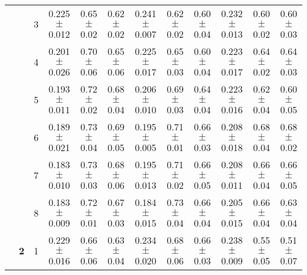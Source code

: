 \begin{table*}
{\begin{tabular}{|l|c|c||c|c|c||c|c|c||c|c|c|}
 & & 3 & \textcolor{gate_color}{0.225$\pm$0.012} & \textcolor{gate_color}{0.65$\pm$0.02} & \textcolor{gate_color}{0.62$\pm$0.02} & \textcolor{mixed_color}{0.241$\pm$0.007} & \textcolor{mixed_color}{0.62$\pm$0.02} & \textcolor{mixed_color}{0.60$\pm$0.04} & \textcolor{pulsed_color}{0.232$\pm$0.013} & \textcolor{pulsed_color}{0.60$\pm$0.02} & \textcolor{pulsed_color}{0.60$\pm$0.03} \\
 & & 4 & \textcolor{gate_color}{0.201$\pm$0.026} & \textcolor{gate_color}{0.70$\pm$0.06} & \textcolor{gate_color}{0.65$\pm$0.06} & \textcolor{mixed_color}{0.225$\pm$0.017} & \textcolor{mixed_color}{0.65$\pm$0.03} & \textcolor{mixed_color}{0.60$\pm$0.04} & \textcolor{pulsed_color}{0.223$\pm$0.017} & \textcolor{pulsed_color}{0.64$\pm$0.02} & \textcolor{pulsed_color}{0.64$\pm$0.03} \\
 & & 5 & \textcolor{gate_color}{0.193$\pm$0.011} & \textcolor{gate_color}{0.72$\pm$0.02} & \textcolor{gate_color}{0.68$\pm$0.04} & \textcolor{mixed_color}{0.206$\pm$0.010} & \textcolor{mixed_color}{0.69$\pm$0.03} & \textcolor{mixed_color}{0.64$\pm$0.04} & \textcolor{pulsed_color}{0.223$\pm$0.016} & \textcolor{pulsed_color}{0.62$\pm$0.04} & \textcolor{pulsed_color}{0.60$\pm$0.05} \\
 & & 6 & \textcolor{gate_color}{0.189$\pm$0.021} & \textcolor{gate_color}{0.73$\pm$0.04} & \textcolor{gate_color}{0.69$\pm$0.05} & \textcolor{mixed_color}{0.195$\pm$0.005} & \textcolor{mixed_color}{0.71$\pm$0.01} & \textcolor{mixed_color}{0.66$\pm$0.03} & \textcolor{pulsed_color}{0.208$\pm$0.018} & \textcolor{pulsed_color}{0.68$\pm$0.04} & \textcolor{pulsed_color}{0.68$\pm$0.02} \\
 & & 7 & \textcolor{gate_color}{0.183$\pm$0.010} & \textcolor{gate_color}{0.73$\pm$0.03} & \textcolor{gate_color}{0.68$\pm$0.06} & \textcolor{mixed_color}{0.195$\pm$0.013} & \textcolor{mixed_color}{0.71$\pm$0.02} & \textcolor{mixed_color}{0.66$\pm$0.05} & \textcolor{pulsed_color}{0.208$\pm$0.011} & \textcolor{pulsed_color}{0.66$\pm$0.04} & \textcolor{pulsed_color}{0.66$\pm$0.05} \\
 & & 8 & \textcolor{gate_color}{0.183$\pm$0.009} & \textcolor{gate_color}{0.72$\pm$0.01} & \textcolor{gate_color}{0.67$\pm$0.03} & \textcolor{mixed_color}{0.184$\pm$0.015} & \textcolor{mixed_color}{0.73$\pm$0.04} & \textcolor{mixed_color}{0.66$\pm$0.04} & \textcolor{pulsed_color}{0.205$\pm$0.015} & \textcolor{pulsed_color}{0.66$\pm$0.04} & \textcolor{pulsed_color}{0.63$\pm$0.04} \\
\cline{2-12}
 & \multirow{8}{*}{\textbf{2}} & 1 & \textcolor{gate_color}{0.229$\pm$0.016} & \textcolor{gate_color}{0.66$\pm$0.06} & \textcolor{gate_color}{0.63$\pm$0.04} & \textcolor{mixed_color}{0.234$\pm$0.020} & \textcolor{mixed_color}{0.68$\pm$0.06} & \textcolor{mixed_color}{0.66$\pm$0.03} & \textcolor{pulsed_color}{0.238$\pm$0.009} & \textcolor{pulsed_color}{0.55$\pm$0.05} & \textcolor{pulsed_color}{0.51$\pm$0.07} \\

\end{tabular}}
\end{table*}

